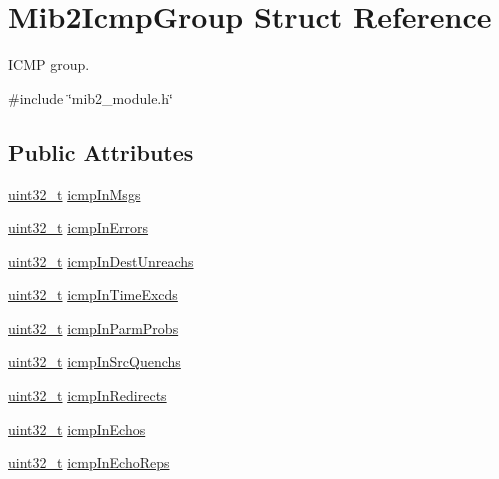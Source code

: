 \hypertarget{structMib2IcmpGroup}{}\section{Mib2\+Icmp\+Group Struct Reference}
\label{structMib2IcmpGroup}


I\+C\+MP group.  




{\ttfamily \#include \char`\"{}mib2\+\_\+module.\+h\char`\"{}}

\subsection*{Public Attributes}
\begin{DoxyCompactItemize}
\item 
\hyperlink{stdint_8h_a435d1572bf3f880d55459d9805097f62}{uint32\+\_\+t} \hyperlink{structMib2IcmpGroup_aafe91e356f08aaab2c006ba52346eef3}{icmp\+In\+Msgs}
\item 
\hyperlink{stdint_8h_a435d1572bf3f880d55459d9805097f62}{uint32\+\_\+t} \hyperlink{structMib2IcmpGroup_a5cd65399321fc0f53917acfa32989e9c}{icmp\+In\+Errors}
\item 
\hyperlink{stdint_8h_a435d1572bf3f880d55459d9805097f62}{uint32\+\_\+t} \hyperlink{structMib2IcmpGroup_aad0c088ba22d28672d9a76a9fc991914}{icmp\+In\+Dest\+Unreachs}
\item 
\hyperlink{stdint_8h_a435d1572bf3f880d55459d9805097f62}{uint32\+\_\+t} \hyperlink{structMib2IcmpGroup_a077fdfaf27e13b801c860c457d3c8a97}{icmp\+In\+Time\+Excds}
\item 
\hyperlink{stdint_8h_a435d1572bf3f880d55459d9805097f62}{uint32\+\_\+t} \hyperlink{structMib2IcmpGroup_a7666a01c815a218f1cca3747b9a6f508}{icmp\+In\+Parm\+Probs}
\item 
\hyperlink{stdint_8h_a435d1572bf3f880d55459d9805097f62}{uint32\+\_\+t} \hyperlink{structMib2IcmpGroup_a81756bd260ba4dfd61627674c97bbed2}{icmp\+In\+Src\+Quenchs}
\item 
\hyperlink{stdint_8h_a435d1572bf3f880d55459d9805097f62}{uint32\+\_\+t} \hyperlink{structMib2IcmpGroup_a1d65f7f538b00e698054dd25d798d636}{icmp\+In\+Redirects}
\item 
\hyperlink{stdint_8h_a435d1572bf3f880d55459d9805097f62}{uint32\+\_\+t} \hyperlink{structMib2IcmpGroup_a4fdad4cb4032754d42d245d48a7e1f6f}{icmp\+In\+Echos}
\item 
\hyperlink{stdint_8h_a435d1572bf3f880d55459d9805097f62}{uint32\+\_\+t} \hyperlink{structMib2IcmpGroup_a21a8ed8000fa93372a74cba337f9a027}{icmp\+In\+Echo\+Reps}

\end{DoxyCompactItemize}
